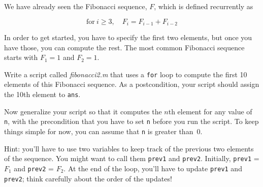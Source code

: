 \begin{ex}
\label{fib2}

We have already seen the Fibonacci sequence, $F$, which
is defined recurrently as

\[ \mathrm{for}~i \ge 3, \quad  F_{i} = F_{i-1} + F_{i-2} \]

In order to get started, you have to specify the first two
elements, but once you have those, you can compute the rest.
The most common Fibonacci sequence starts with $F_1 = 1$ and $F_2 = 1$.

Write a script called \emph{fibonacci2.m} that uses a \lstinline{for} loop
to compute the first 10 elements of this Fibonacci sequence.
As a postcondition, your script should assign the 10th element to
\lstinline{ans}.

Now generalize your script so that it computes the $n$th element
for any value of \lstinline{n}, with the precondition that you have to
set \lstinline{n} before you run the script.  To keep things simple for
now, you can assume that \lstinline{n} is greater than~0.

Hint: you'll have to use two variables to keep track of the
previous two elements of the sequence.  You might want to call
them \lstinline{prev1} and \lstinline{prev2}.  Initially, \lstinline{prev1} = $F_1$
and \lstinline{prev2} = $F_2$.  At the end of the loop, you'll have
to update \lstinline{prev1} and \lstinline{prev2}; think carefully about the
order of the updates!

\end{ex}
